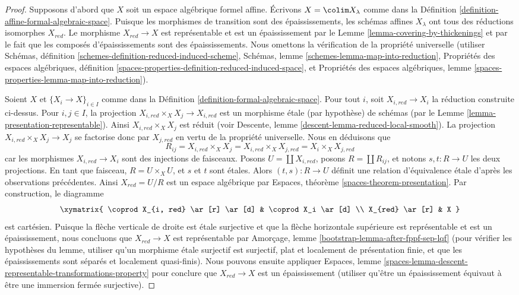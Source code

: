 \begin{proof}
Supposons d'abord que $X$ soit un espace algébrique formel affine.
Écrivons $X = \colim X_\lambda$ comme dans la
Définition \ref{definition-affine-formal-algebraic-space}.
Puisque les morphismes de transition sont des épaississements, les schémas
affines $X_\lambda$ ont tous des réductions isomorphes $X_{red}$.
Le morphisme $X_{red} \to X$ est représentable et est un épaississement
par le Lemme \ref{lemma-covering-by-thickenings} et par le fait que
les composés d'épaississements sont des épaississements. Nous omettons la
vérification de la propriété
universelle (utiliser Schémas, définition
\ref{schemes-definition-reduced-induced-scheme},
Schémas, lemme \ref{schemes-lemma-map-into-reduction},
Propriétés des espaces algébriques, définition
\ref{spaces-properties-definition-reduced-induced-space}, et
Propriétés des espaces algébriques, lemme \ref{spaces-properties-lemma-map-into-reduction}).

\medskip\noindent
Soient $X$ et $\{X_i \to X\}_{i \in I}$ comme dans la
Définition \ref{definition-formal-algebraic-space}.
Pour tout $i$, soit $X_{i, red} \to X_i$ la réduction construite
ci-dessus. Pour $i, j \in I$, la projection
$X_{i, red} \times_X X_j \to X_{i, red}$ est un morphisme étale (par hypothèse)
de schémas (par le Lemme \ref{lemma-presentation-representable}).
Ainsi $X_{i, red} \times_X X_j$ est réduit (voir
Descente, lemme \ref{descent-lemma-reduced-local-smooth}).
La projection $X_{i, red} \times_X X_j \to X_j$ se factorise donc
par $X_{j, red}$ en vertu de la propriété universelle. Nous en déduisons que
$$
R_{ij} = X_{i, red} \times_X X_j = X_{i, red} \times_X X_{j, red} =
X_i \times_X X_{j, red}
$$
car les morphismes $X_{i, red} \to X_i$ sont des injections de faisceaux.
Posons $U = \coprod X_{i, red}$, posons
$R = \coprod R_{ij}$, et notons $s, t : R \to U$ les deux
projections. En tant que faisceau, $R = U \times_X U$, et $s$ et $t$
sont étales. Alors $(t, s) : R \to U$ définit une relation d'équivalence
étale d'après les observations précédentes. Ainsi $X_{red} = U/R$ est un
espace algébrique par Espaces, théorème \ref{spaces-theorem-presentation}.
Par construction, le diagramme
$$
\xymatrix{
\coprod X_{i, red} \ar[r] \ar[d] & \coprod X_i \ar[d] \\
X_{red} \ar[r] & X
}
$$
est cartésien. Puisque la flèche verticale de droite est étale surjective
et que la flèche horizontale supérieure est représentable et est un épaississement,
nous concluons que $X_{red} \to X$ est représentable par
Amorçage, lemme \ref{bootstrap-lemma-after-fppf-sep-lqf}
(pour vérifier les hypothèses du lemme, utiliser qu'un morphisme étale
surjectif est surjectif, plat et localement de présentation
finie, et que les épaississements sont séparés et localement quasi-finis).
Nous pouvons ensuite appliquer Espaces, lemme
\ref{spaces-lemma-descent-representable-transformations-property}
pour conclure que $X_{red} \to X$ est un épaississement
(utiliser qu'être un épaississement équivaut à être
une immersion fermée surjective).


\end{proof}
